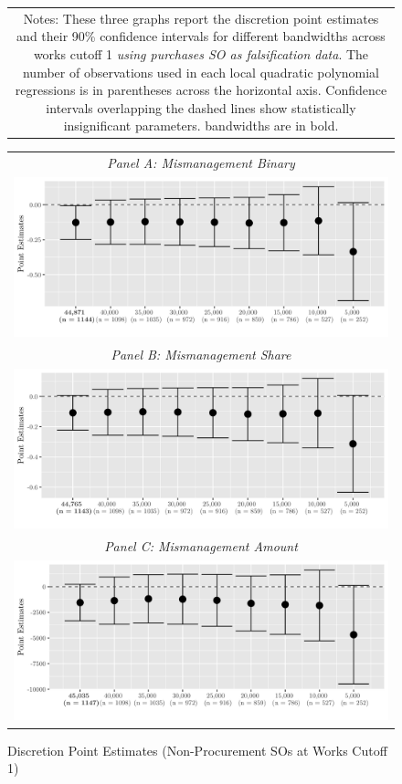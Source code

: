 \documentclass[11pt]{article}
\begin{document}
\begin{figure}[!htbp]
\begin{tabular}{c}
  \multicolumn{1}{p{.67\textwidth}}{\scriptsize Notes: These three graphs report the discretion point estimates and their 90\% confidence intervals for different bandwidths across works cutoff 1 \emph{using purchases SO as falsification data}. The number of observations used in each local quadratic polynomial regressions is in parentheses across the horizontal axis. Confidence intervals overlapping the dashed lines show statistically insignificant parameters. \citet{CattaneoInterpretingRegressionDiscontinuity2016,CattaneoAnalysisRegressionDiscontinuity2018} bandwidths are in bold.}
  \end{tabular}
\end{figure}

\begin{figure}[!htbp]
  \caption{Discretion Point Estimates (Non-Procurement SOs at Works Cutoff 1)}
  \label{fig:02falsification}
  \centering
  \small
  \begin{tabular}{c}
  \emph{Panel A: Mismanagement Binary} \\
  \includegraphics[scale = .15]{02falsificationplot1} \\
  \emph{Panel B: Mismanagement Share} \\
  \includegraphics[scale = .15]{02falsificationplot2} \\
  \emph{Panel C: Mismanagement Amount} \\
  \includegraphics[scale = .15]{02falsificationplot3} \\

\end{tabular}
\end{figure}
\end{document}
